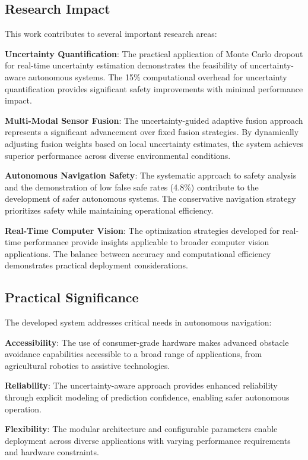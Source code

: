 \documentclass[10pt]{article}
\begin{document}
\subsection{Research Impact}

This work contributes to several important research areas:

\textbf{Uncertainty Quantification}: The practical application of Monte Carlo dropout for real-time uncertainty estimation demonstrates the feasibility of uncertainty-aware autonomous systems. The 15\% computational overhead for uncertainty quantification provides significant safety improvements with minimal performance impact.

\textbf{Multi-Modal Sensor Fusion}: The uncertainty-guided adaptive fusion approach represents a significant advancement over fixed fusion strategies. By dynamically adjusting fusion weights based on local uncertainty estimates, the system achieves superior performance across diverse environmental conditions.

\textbf{Autonomous Navigation Safety}: The systematic approach to safety analysis and the demonstration of low false safe rates (4.8\%) contribute to the development of safer autonomous systems. The conservative navigation strategy prioritizes safety while maintaining operational efficiency.

\textbf{Real-Time Computer Vision}: The optimization strategies developed for real-time performance provide insights applicable to broader computer vision applications. The balance between accuracy and computational efficiency demonstrates practical deployment considerations.

\subsection{Practical Significance}

The developed system addresses critical needs in autonomous navigation:

\textbf{Accessibility}: The use of consumer-grade hardware makes advanced obstacle avoidance capabilities accessible to a broad range of applications, from agricultural robotics to assistive technologies.

\textbf{Reliability}: The uncertainty-aware approach provides enhanced reliability through explicit modeling of prediction confidence, enabling safer autonomous operation.

\textbf{Flexibility}: The modular architecture and configurable parameters enable deployment across diverse applications with varying performance requirements and hardware constraints.
\end{document}
